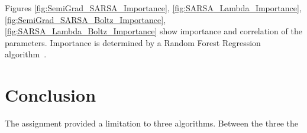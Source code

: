 \documentclass[journal]{IEEEtran}
\begin{document}
Figures \ref{fig:SemiGrad_SARSA_Importance}, \ref{fig:SARSA_Lambda_Importance},
\ref{fig:SemiGrad_SARSA_Boltz_Importance}, \ref{fig:SARSA_Lambda_Boltz_Importance}
show importance and correlation of the parameters.
Importance is determined by a Random Forest Regression algorithm~\cite{probst2019}.

\section{Conclusion}
\label{sec:conclusion}

The assignment provided a limitation to three algorithms.
Between the three the 

\label{sec:references}
\printbibliography

\end{document}
